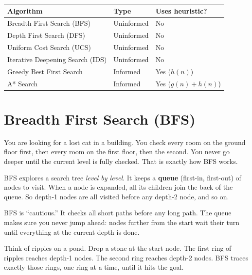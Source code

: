 \documentclass[a4paper,11pt]{article}
\newcommand{\vocab}[1]{\textbf{\color{navy}#1}}
\begin{document}
\bigskip
\begin{center}\small
\begin{tabular}{@{}lll@{}}
\toprule
\textbf{Algorithm} & \textbf{Type} & \textbf{Uses heuristic?}\\
\midrule
Breadth First Search (BFS) & Uninformed & No\\
Depth First Search (DFS) & Uninformed & No\\
Uniform Cost Search (UCS) & Uninformed & No\\
Iterative Deepening Search (IDS) & Uninformed & No\\
Greedy Best First Search & Informed & Yes ($h(n)$)\\
A* Search & Informed & Yes ($g(n)+h(n)$)\\
\bottomrule
\end{tabular}
\end{center}

\section{Breadth First Search (BFS)}

You are looking for a lost cat in a building. You check every room on the
ground floor first, then every room on the first floor, then the second.
You never go deeper until the current level is fully checked. That is exactly
how BFS works.

BFS explores a search tree \emph{level by level}. It keeps a \vocab{queue}
(first-in, first-out) of nodes to visit. When a node is expanded, all its
children join the back of the queue. So depth-1 nodes are all visited before
any depth-2 node, and so on.

\begin{intuition}
BFS is ``cautious.'' It checks all short paths before any long path. The queue
makes sure you never jump ahead: nodes further from the start wait their
turn until everything at the current depth is done.
\end{intuition}

\begin{everyday}
Think of ripples on a pond. Drop a stone at the start node. The first ring
of ripples reaches depth-1 nodes. The second ring reaches depth-2 nodes. BFS
traces exactly those rings, one ring at a time, until it hits the goal.
\end{everyday}
\end{document}
